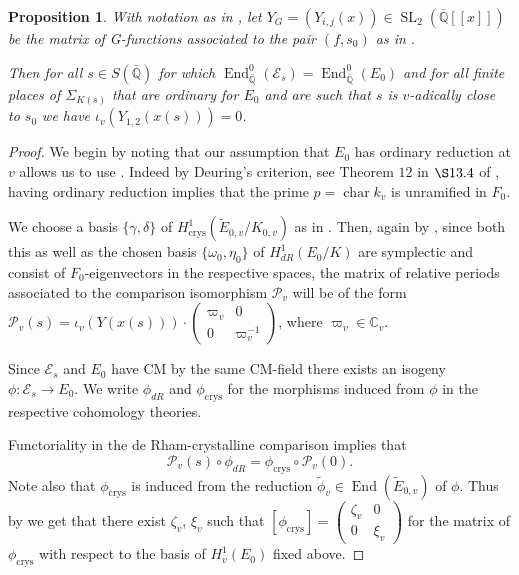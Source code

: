 \documentclass[12pt,twoside,a4paper]{article}
\theoremstyle{plain}%
\newtheorem{prop}[theorem]{Proposition}
\DeclareMathOperator{\End}{End}
\DeclareMathOperator{\SL}{SL}
\DeclareMathOperator{\chara}{char}
\DeclareMathOperator{\crys}{crys}
\newcommand{\C}{\mathbb{C}}
\newcommand{\Q}{\mathbb{Q}}
\newcommand{\CE}{\mathcal{E}}
\newcommand{\CP}{\mathcal{P}}
\begin{document}
\begin{prop}\label{thmordrels}With notation as in , let $Y_G=(Y_{i,j}(x))\in \SL_2(\bar{\Q}[[x]])$ be the matrix of G-functions associated to the pair $(f,s_0)$ as in . 
	
	Then for all $s\in S(\bar{\Q})$ for which $\End^{0}_{\bar{\Q}}(\CE_s)=\End^{0}_{\bar{\Q}}(E_0)$ and for all finite places of $\Sigma_{K(s)}$ that are ordinary for $E_0$ and are such that $s$ is $v$-adically close to $s_0$ we have $\iota_v(Y_{1,2}(x(s)))=0$.\end{prop}
\begin{proof}
	We begin by noting that our assumption that $E_0$ has ordinary reduction at $v$ allows us to use . Indeed by Deuring's criterion, see Theorem $12$ in $\S13.4$ of \cite{langellfuns}, having ordinary reduction implies that the prime $p=\chara{k_v}$ is unramified in $F_0$.
	
	We choose a basis $\{\gamma,\delta\}$ of $H^1_{\crys}(\tilde{E}_{0,v}/K_{0,v})$ as in . Then, again by , since both this as well as the chosen basis $\{\omega_0,\eta_0\}$ of $H^1_{dR}(E_0/K)$ are symplectic and consist of $F_0$-eigenvectors in the respective spaces, the matrix of relative periods associated to the comparison isomorphism $\CP_v$ will be of the form $\CP_v(s)=\iota_v(Y(x(s)))\cdot \begin{pmatrix}
		\varpi_v&0\\0&\varpi_v^{-1}
	\end{pmatrix}$, where $\varpi_v\in \C_v$.

Since $\CE_s$ and $E_0$ have CM by the same CM-field there exists an isogeny $\phi:\CE_s\rightarrow E_0$. We write $\phi_{dR}$ and $\phi_{\crys}$ for the morphisms induced from $\phi$ in the respective cohomology theories. 

Functoriality in the de Rham-crystalline comparison implies that \begin{equation}\label{eq:isogcompat}\CP_v(s)\circ \phi_{dR}=\phi_{\crys}\circ\CP_v(0).\end{equation} Note also that $\phi_{\crys}$ is induced from the reduction $\tilde{\phi}_v\in \End(\tilde{E}_{0,v})$ of $\phi$. Thus by  we get that there exist $\zeta_v$, $\xi_v$ such that $[\phi_{\crys}]=\begin{pmatrix}	\zeta_v&0\\0&\xi_v\end{pmatrix}$ for the matrix of $\phi_{\crys}$ with respect to the basis of $H^1_v(E_0)$ fixed above.


\end{proof}
\end{document}

